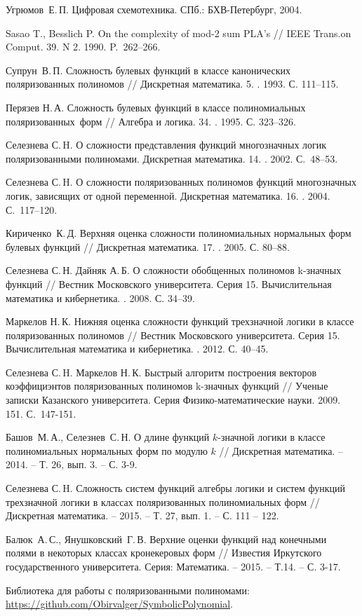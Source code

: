 \documentclass[bibliography=totoc, a4paper, 12pt]{extarticle}
\begin{document}
\begin{singlespace}
\begin{thebibliography}{0}
 Угрюмов~Е.\,П. Цифровая схемотехника. СПб.: БХВ-Петербург, 2004.

 Sasao T., Besslich P. On the complexity of mod-2 sum PLA’s  //
IEEE Trans.on Comput. 39. N 2. 1990. P.~262--266.

 Супрун~В.\,П. Сложность булевых функций в классе канонических
поляризованных полиномов // Дискретная математика. 5. . 1993. С.
111--115.

 Перязев Н.\,А. Сложность булевых функций в классе полиномиальных
поляризованных~форм // Алгебра и логика. 34. . 1995. С. 323--326.

 Селезнева С.\,H. О сложности представления функций многозначных
логик поляризованными полиномами. Дискретная математика. 14. .
2002. С.~48--53.

 Селезнева С.\,H. О сложности поляризованных полиномов функций
многозначных логик, зависящих от одной переменной. Дискретная математика. 16.
. 2004. С.~117--120.

 Кириченко~К.\,Д. Верхняя оценка сложности полиномиальных
нормальных форм булевых функций // Дискретная математика. 17. .
2005. С. 80--88.

 Селезнева С.\,Н. Дайняк А.\,Б. О сложности обобщенных полиномов
k\nobreakdash-значных функций // Вестник Московского университета. Серия 15.
Вычислительная математика и кибернетика. . 2008. С. 34--39.

 Маркелов Н.\,К. Нижняя оценка сложности функций трехзначной
логики в классе поляризованных полиномов // Вестник Московского университета.
Серия 15. Вычислительная математика и кибернетика. . 2012. С.
40--45.

 Селезнева С.\,H. Маркелов Н.\,К. Быстрый алгоритм построения
векторов коэффициэнтов поляризованных полиномов k-значных функций // Ученые
записки Казанского университета. Серия Физико-математические науки. 2009. 151.
 С.~147-151.

 Башов~М.\,А., Селезнев~С.\,Н. О длине функций $k$-значной логики
в классе полиномиальных нормальных форм по модулю $k$ // Дискретная математика.
-- 2014. -- Т. 26, вып. 3. -- С. 3-9.

 Селезнева С.\,H. Сложность систем функций алгебры логики и систем
функций трехзначной логики в классах поляризованных полиномиальных форм //
Дискретная математика. -- 2015. -- Т. 27, вып. 1. -- С. 111 -- 122.

 Балюк~А.\,С., Янушковский~Г.\,В. Верхние оценки функций над
конечными полями в некоторых классах кронекеровых форм // Известия Иркутского
государственного университета. Серия: Математика. -- 2015. -- Т.14. -- С. 3-17.

 Библиотека для работы с поляризованными полиномами:
\url{https://github.com/Obirvalger/SymbolicPolynomial}.
\end{thebibliography}

\end{singlespace}
\end{document}
